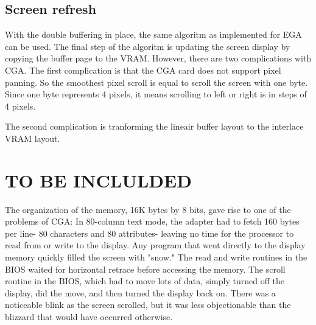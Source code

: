 \documentclass[book.tex]{subfiles}
\begin{document}
\subsection{Screen refresh}
With the double buffering in place, the same algoritm as implemented for EGA can be used. The final step of the algoritm is updating the screen display by copying the buffer page to the VRAM. However, there are two complications with CGA. The first complication is that the CGA card does not support pixel panning. So the smoothest pixel scroll is equal to scroll the screen with one byte. Since one byte represents 4 pixels, it means scrolling to left or right is in steps of 4 pixels.\\
\par
The second complication is tranforming the lineair buffer layout to the interlace VRAM layout. 

\section{TO BE INCLULDED}
The organization of the memory, 16K bytes by 8 bits, gave rise to one of the problems of CGA: In 80-column text mode, the adapter had to fetch 160 bytes per line- 80 characters and 80 attributes- leaving no time for the processor to read from or write to the display. Any program that went directly to the display memory quickly filled the screen with "snow." The read and write routines in the BIOS waited for horizontal retrace before accessing the memory. The scroll routine in the BIOS, which had to move lots of data, simply turned off the display, did the move, and then turned the display back on. There was a noticeable blink as the screen scrolled, but it was less objectionable than the blizzard that would have occurred otherwise.
\end{document}
